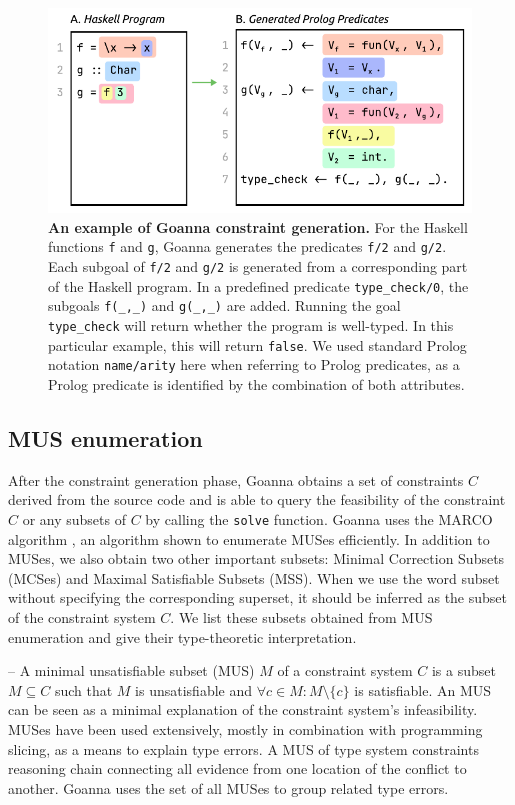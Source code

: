 \documentclass[pdflatex,lineno,sn-nature,Numbered]{sn-jnl}%
\begin{document}
  \begin{figure}[htb]
        \centering
    \includegraphics[width=0.7\linewidth]{images/Translation-Example}
        \caption[An example of Goanna constraint generation]{\textbf{An example of Goanna constraint generation.} For the Haskell functions \texttt{f} and \texttt{g}, Goanna generates the predicates \texttt{f/2} and \texttt{g/2}. Each subgoal of \texttt{f/2} and \texttt{g/2} is generated from a corresponding part of the Haskell program. In a predefined predicate \texttt{type\_check/0}, the subgoals \texttt{f(\_,\_)} and \texttt{g(\_,\_)} are added. Running the goal \texttt{type\_check} will return whether the program is well-typed. In this particular example, this will return \texttt{false}. We used standard Prolog notation \texttt{name/arity} here when referring to Prolog predicates, as a Prolog predicate is identified by the combination of both attributes. 
}
        \label{fig:translation-example}
    \end{figure}
    

    \subsection{MUS enumeration} \label{sub:enumeration}
    After the constraint generation phase, Goanna obtains a set of constraints $C$ derived from the source code and is able to query the feasibility of the constraint $C$ or any subsets of $C$ by calling the \texttt{solve} function. Goanna uses the MARCO algorithm \cite{Liffiton2016-xi}, an algorithm shown to enumerate MUSes efficiently. In addition to MUSes, we also obtain two other important subsets: Minimal Correction Subsets (MCSes) and Maximal Satisfiable Subsets (MSS). When we use the word subset without specifying the corresponding superset, it should be inferred as the subset of the constraint system $C$. We list these subsets obtained from MUS enumeration and give their type-theoretic interpretation. 
        
    – A minimal unsatisfiable subset (MUS) $M$ of a constraint system $C$ is a subset $M \subseteq C$ such that $M$ is unsatisfiable and $ \forall{c} \in M : M \setminus \{c\}$ is satisfiable. An MUS can be seen as a minimal explanation of the constraint system’s infeasibility. MUSes have been used extensively, mostly in combination with programming slicing, as a means to explain type errors. A MUS of type system constraints reasoning chain connecting all evidence from one location of the conflict to another. Goanna uses the set of all MUSes to group related type errors.
\end{document}
